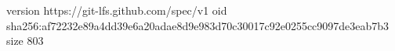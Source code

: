 version https://git-lfs.github.com/spec/v1
oid sha256:af72232e89a4dd39e6a20adae8d9e983d70c30017c92e0255cc9097de3eab7b3
size 803
